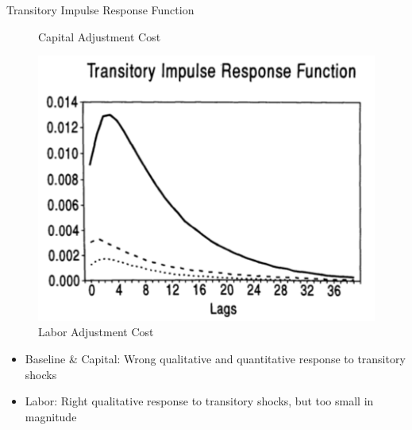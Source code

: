 \documentclass[10pt]{beamer}
\begin{document}
\begin{frame}{Transitory Impulse Response Function}
\begin{minipage}{0.33\textwidth}
\begin{figure}
  \caption{Capital Adjustment Cost}
\end{figure}
\end{minipage}%
\begin{minipage}{0.33\textwidth}
\begin{figure}
  \centering
  \includegraphics[width=\linewidth]{L_trans_IRF.png}
  \caption{Labor Adjustment Cost}
\end{figure}
\end{minipage}
\begin{itemize}
    \item Baseline \& Capital: Wrong qualitative and quantitative response to transitory shocks
    \item Labor: Right qualitative response to transitory shocks, but too small in magnitude
\end{itemize}

\end{frame}
\end{document}
